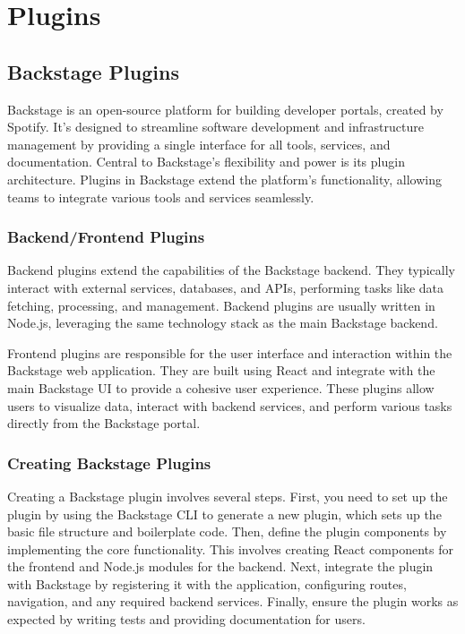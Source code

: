 \chapter{Plugins}
\label{ch:plugins}

\section{Backstage Plugins}

Backstage is an open-source platform for building developer portals, created by Spotify. It's designed to streamline software development and infrastructure management by providing a single interface for all tools, services, and documentation. Central to Backstage's flexibility and power is its plugin architecture. Plugins in Backstage extend the platform's functionality, allowing teams to integrate various tools and services seamlessly.

\subsection{Backend/Frontend Plugins}

Backend plugins extend the capabilities of the Backstage backend. They typically interact with external services, databases, and APIs, performing tasks like data fetching, processing, and management. Backend plugins are usually written in Node.js, leveraging the same technology stack as the main Backstage backend.

Frontend plugins are responsible for the user interface and interaction within the Backstage web application. They are built using React and integrate with the main Backstage UI to provide a cohesive user experience. These plugins allow users to visualize data, interact with backend services, and perform various tasks directly from the Backstage portal.

\subsection{Creating Backstage Plugins}

Creating a Backstage plugin involves several steps. First, you need to set up the plugin by using the Backstage CLI to generate a new plugin, which sets up the basic file structure and boilerplate code. Then, define the plugin components by implementing the core functionality. This involves creating React components for the frontend and Node.js modules for the backend. Next, integrate the plugin with Backstage by registering it with the application, configuring routes, navigation, and any required backend services. Finally, ensure the plugin works as expected by writing tests and providing documentation for users.

